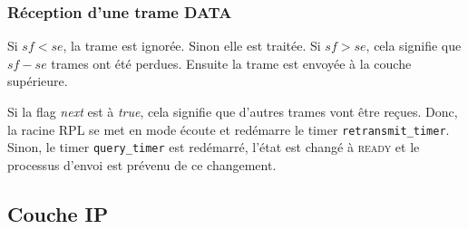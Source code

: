     \subsubsection*{Réception d'une trame DATA}
        Si $sf<se$, la trame est ignorée. Sinon elle est traitée. Si $sf > se$, cela signifie que $sf - se$ trames ont été perdues. Ensuite la trame est envoyée à la couche supérieure.

        Si la flag \textit{next} est à \textit{true}, cela signifie que d'autres trames vont être reçues. Donc, la racine RPL se met en mode écoute et redémarre le timer \texttt{retransmit\_timer}. Sinon, le timer \texttt{query\_timer} est redémarré, l'état est changé à \textsc{ready} et le processus d'envoi est prévenu de ce changement.


\subsection*{Couche IP}
